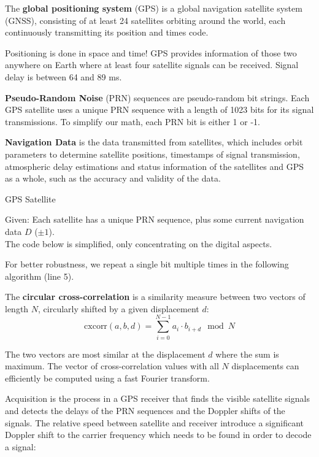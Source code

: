The \textbf{global positioning system} (GPS) is a global navigation satellite system (GNSS), consisting of at least 24 satellites orbiting around the world, each continuously transmitting its position and times code. \medskip

Positioning is done in space and time! GPS provides information of those two anywhere on Earth where at least four satellite signals can be received. Signal delay is between 64 and 89 ms. \medskip

\textbf{Pseudo-Random Noise} (PRN) sequences are pseudo-random bit strings. Each GPS satellite uses a unique PRN sequence with a length of 1023 bits for its signal transmissions. To simplify our math, each PRN bit is either 1 or -1. \medskip

\textbf{Navigation Data} is the data transmitted from satellites, which includes orbit parameters to determine satellite positions, timestamps of signal transmission, atmospheric delay estimations and status information of the satellites and GPS as a whole, such as the accuracy and validity of the data.\medskip

\begin{algorithm}[H]
\caption{GPS Satellite}
	Given: Each satellite has a unique PRN sequence, plus some current navigation data $D$ ($\pm 1$). \\
	The code below is simplified, only concentrating on the digital aspects.
	
	\BlankLine
	
\end{algorithm}
\medskip

For better robustness, we repeat a single bit multiple times in the following algorithm (line 5). \medskip

The \textbf{circular cross-correlation} is a similarity measure between two vectors of length $N$, circularly shifted by a given displacement $d$:
$$\text{cxcorr}(a,b,d) = \sum_{i=0}^{N-1} a_i \cdot b_{i+d} \mod N$$

The two vectors are most similar at the displacement $d$ where the sum is maximum. The vector of cross-correlation values with all $N$ displacements can efficiently be computed using a fast Fourier transform. \medskip

Acquisition is the process in a GPS receiver that finds the visible satellite signals and detects the delays of the PRN sequences and the Doppler shifts of the signals. The relative speed between satellite and receiver introduce a significant Doppler shift to the carrier frequency which needs to be found in order to decode a signal:\medskip

